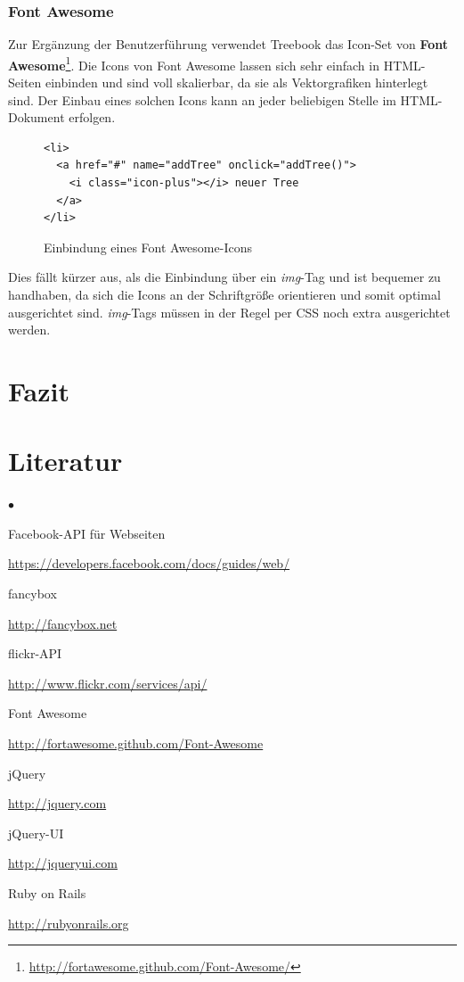 \documentclass[10pt,a4paper]{book}
\begin{document}
\subsection{Font Awesome}
Zur Ergänzung der Benutzerführung verwendet Treebook das Icon-Set von \textbf{Font Awesome}\footnote{\href{http://fortawesome.github.com/Font-Awesome/}{http://fortawesome.github.com/Font-Awesome/}}.
Die Icons von Font Awesome lassen sich sehr einfach in HTML-Seiten einbinden und sind voll skalierbar, da sie als Vektorgrafiken hinterlegt sind.
Der Einbau eines solchen Icons kann an jeder beliebigen Stelle im HTML-Dokument erfolgen.
\begin{figure}[htbp]
\centering
\begin{lstlisting}
<li>
  <a href="#" name="addTree" onclick="addTree()">
    <i class="icon-plus"></i> neuer Tree
  </a>
</li>
\end{lstlisting}
\caption{Einbindung eines Font Awesome-Icons}%
\end{figure}
Dies fällt kürzer aus, als die Einbindung über ein \textit{img}-Tag und ist bequemer zu handhaben, da sich die Icons an der Schriftgröße orientieren und somit optimal ausgerichtet sind. \textit{img}-Tags müssen in der Regel per CSS noch extra ausgerichtet werden.

\chapter{Fazit}

\chapter{Literatur}
\begin{list}{$\bullet$}{}
\item Facebook-API für Webseiten

\href{https://developers.facebook.com/docs/guides/web/}{https://developers.facebook.com/docs/guides/web/}
\item fancybox

\href{http://fancybox.net}{http://fancybox.net}
\item flickr-API

\href{http://www.flickr.com/services/api/}{http://www.flickr.com/services/api/}
\item Font Awesome

\href{http://fortawesome.github.com/Font-Awesome}{http://fortawesome.github.com/Font-Awesome}
\item jQuery

\href{http://jquery.com}{http://jquery.com}
\item jQuery-UI

\href{http://jqueryui.com}{http://jqueryui.com}
\item Ruby on Rails

\href{http://rubyonrails.org}{http://rubyonrails.org}
\end{list}
\end{document}
